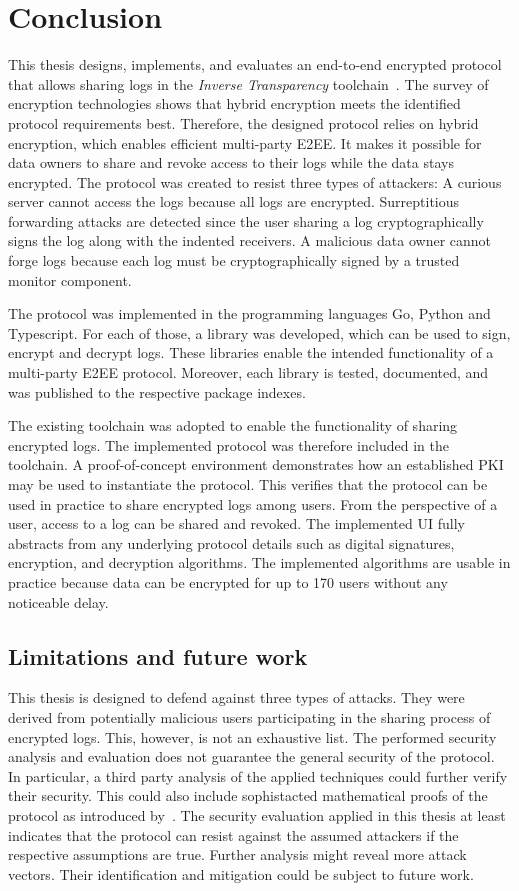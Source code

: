 \documentclass[../main.tex]{subfiles}
\begin{document}
\chapter{Conclusion}

This thesis designs, implements, and evaluates an end-to-end encrypted protocol that allows sharing logs in the \emph{Inverse Transparency} toolchain~\cite{Zieglmeier2021}.
The survey of encryption technologies shows that hybrid encryption meets the identified protocol requirements best.
Therefore, the designed protocol relies on hybrid encryption, which enables efficient multi-party E2EE.
It makes it possible for data owners to share and revoke access to their logs while the data stays encrypted.
The protocol was created to resist three types of attackers: 
A curious server cannot access the logs because all logs are encrypted.
Surreptitious forwarding attacks are detected since the user sharing a log cryptographically signs the log along with the indented receivers.
A malicious data owner cannot forge logs because each log must be cryptographically signed by a trusted monitor component.

The protocol was implemented in the programming languages Go, Python and Typescript.
For each of those, a library was developed, which can be used to sign, encrypt and decrypt logs.
These libraries enable the intended functionality of a multi-party E2EE protocol.
Moreover, each library is tested, documented, and was published to the respective package indexes.

The existing toolchain was adopted to enable the functionality of sharing encrypted logs.
The implemented protocol was therefore included in the toolchain.
A proof-of-concept environment demonstrates how an established PKI may be used to instantiate the protocol.
This verifies that the protocol can be used in practice to share encrypted logs among users.
From the perspective of a user, access to a log can be shared and revoked.
The implemented UI fully abstracts from any underlying protocol details such as digital signatures, encryption, and decryption algorithms.
The implemented algorithms are usable in practice because data can be encrypted for up to 170 users without any noticeable delay.

\section{Limitations and future work}
This thesis is designed to defend against three types of attacks.
They were derived from potentially malicious users participating in the sharing process of encrypted logs.
This, however, is not an exhaustive list.
The performed security analysis and evaluation does not guarantee the general security of the protocol.
In particular, a third party analysis of the applied techniques could further verify their security.
This could also include sophistacted mathematical proofs of the protocol as introduced by~\cite{Katz2020}.   
The security evaluation applied in this thesis at least indicates that the protocol can resist against the assumed attackers if the respective assumptions are true.
Further analysis might reveal more attack vectors.
Their identification and mitigation could be subject to future work.
\end{document}
